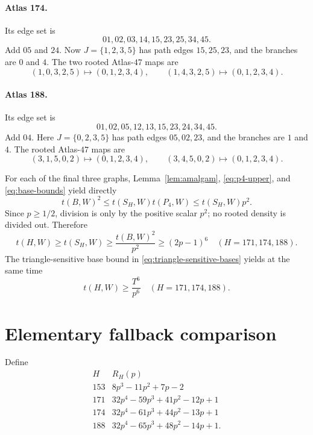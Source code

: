 \documentclass[11pt]{article}
\begin{document}
\paragraph{Atlas 174.}
Its edge set is
\[
 01,02,03,14,15,23,25,34,45.
\]
Add $05$ and $24$.  Now $J=\{1,2,3,5\}$ has path edges $15,25,23$,
and the branches are $0$ and $4$.  The two rooted Atlas-$47$ maps are
\[
 (1,0,3,2,5)\mapsto(0,1,2,3,4),
 \qquad
 (1,4,3,2,5)\mapsto(0,1,2,3,4).
\]

\paragraph{Atlas 188.}
Its edge set is
\[
 01,02,05,12,13,15,23,24,34,45.
\]
Add $04$.  Here $J=\{0,2,3,5\}$ has path edges $05,02,23$, and the
branches are $1$ and $4$.  The rooted Atlas-$47$ maps are
\[
 (3,1,5,0,2)\mapsto(0,1,2,3,4),
 \qquad
 (3,4,5,0,2)\mapsto(0,1,2,3,4).
\]

For each of the final three graphs, Lemma~\ref{lem:amalgam},
\eqref{eq:p4-upper}, and \eqref{eq:base-bounds} yield directly
\[
 t(B,W)^2
 \leq t(S_H,W)t(P_4,W)
 \leq t(S_H,W)p^2.
\]
Since $p\geq1/2$, division is only by the positive scalar $p^2$; no
rooted density is divided out.  Therefore
\begin{equation}\label{eq:three-lower}
 t(H,W)\geq t(S_H,W)
 \geq\frac{t(B,W)^2}{p^2}
 \geq(2p-1)^6
 \quad(H=171,174,188).
\end{equation}
The triangle-sensitive base bound in
\eqref{eq:triangle-sensitive-bases} yields at the same time
\begin{equation}\label{eq:three-triangle-lower}
 t(H,W)\geq\frac{T^6}{p^6}
 \quad(H=171,174,188).
\end{equation}

\section{Elementary fallback comparison}\label{sec:elementary-comparison}

Define
\[
\begin{array}{c|l}
H&R_H(p)\\ \hline
153&8p^3-11p^2+7p-2\\
171&32p^4-59p^3+41p^2-12p+1\\
174&32p^4-61p^3+44p^2-13p+1\\
188&32p^4-65p^3+48p^2-14p+1.
\end{array}
\]
\end{document}
